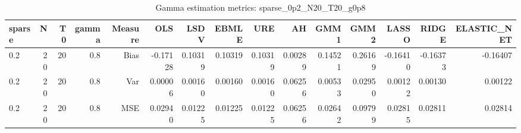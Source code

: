 \begin{table}[!htbp]\centering
\caption{Gamma estimation metrics: sparse_0p2_N20_T20_g0p8}
\label{tab:table1_sparse_0p2_N20_T20_g0p8}
\begin{tabular}{lrrrrrrrrrrrrrr}
\hline
sparse & N & T0 & gamma & Measure & OLS & LSDV & EBMLE & URE & AH & GMM1 & GMM2 & LASSO & RIDGE & ELASTIC_NET \\
\hline
0.2 & 20 & 20 & 0.8 & Bias & -0.17128 & 0.10319 & 0.10319 & 0.10319 & 0.00289 & 0.14521 & 0.26169 & -0.16410 & -0.16373 & -0.16407 \\
0.2 & 20 & 20 & 0.8 & Var & 0.00006 & 0.00160 & 0.00160 & 0.00160 & 0.06256 & 0.00533 & 0.02950 & 0.00122 & 0.00130 & 0.00122 \\
0.2 & 20 & 20 & 0.8 & MSE & 0.02940 & 0.01225 & 0.01225 & 0.01225 & 0.06256 & 0.02642 & 0.09799 & 0.02815 & 0.02811 & 0.02814 \\
\hline
\end{tabular}
\end{table}

